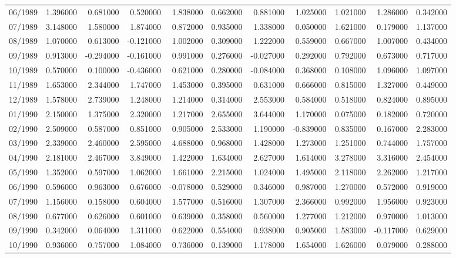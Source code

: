 \begin{tabular}{lrrrrrrrrrr}
06/1989 & 1.396000 & 0.681000 & 0.520000 & 1.838000 & 0.662000 & 0.881000 & 1.025000 & 1.021000 & 1.286000 & 0.342000 \\
07/1989 & 3.148000 & 1.580000 & 1.874000 & 0.872000 & 0.935000 & 1.338000 & 0.050000 & 1.621000 & 0.179000 & 1.137000 \\
08/1989 & 1.070000 & 0.613000 & -0.121000 & 1.002000 & 0.309000 & 1.222000 & 0.559000 & 0.667000 & 1.007000 & 0.434000 \\
09/1989 & 0.913000 & -0.294000 & -0.161000 & 0.991000 & 0.276000 & -0.027000 & 0.292000 & 0.792000 & 0.673000 & 0.717000 \\
10/1989 & 0.570000 & 0.100000 & -0.436000 & 0.621000 & 0.280000 & -0.084000 & 0.368000 & 0.108000 & 1.096000 & 1.097000 \\
11/1989 & 1.653000 & 2.344000 & 1.747000 & 1.453000 & 0.395000 & 0.631000 & 0.666000 & 0.815000 & 1.327000 & 0.449000 \\
12/1989 & 1.578000 & 2.739000 & 1.248000 & 1.214000 & 0.314000 & 2.553000 & 0.584000 & 0.518000 & 0.824000 & 0.895000 \\
01/1990 & 2.150000 & 1.375000 & 2.320000 & 1.217000 & 2.655000 & 3.644000 & 1.170000 & 0.075000 & 0.182000 & 0.720000 \\
02/1990 & 2.509000 & 0.587000 & 0.851000 & 0.905000 & 2.533000 & 1.190000 & -0.839000 & 0.835000 & 0.167000 & 2.283000 \\
03/1990 & 2.339000 & 2.460000 & 2.595000 & 4.688000 & 0.968000 & 1.428000 & 1.273000 & 1.251000 & 0.744000 & 1.757000 \\
04/1990 & 2.181000 & 2.467000 & 3.849000 & 1.422000 & 1.634000 & 2.627000 & 1.614000 & 3.278000 & 3.316000 & 2.454000 \\
05/1990 & 1.352000 & 0.597000 & 1.062000 & 1.661000 & 2.215000 & 1.024000 & 1.495000 & 2.118000 & 2.262000 & 1.217000 \\
06/1990 & 0.596000 & 0.963000 & 0.676000 & -0.078000 & 0.529000 & 0.346000 & 0.987000 & 1.270000 & 0.572000 & 0.919000 \\
07/1990 & 1.156000 & 0.158000 & 0.604000 & 1.577000 & 0.516000 & 1.307000 & 2.366000 & 0.992000 & 1.956000 & 0.923000 \\
08/1990 & 0.677000 & 0.626000 & 0.601000 & 0.639000 & 0.358000 & 0.560000 & 1.277000 & 1.212000 & 0.970000 & 1.013000 \\
09/1990 & 0.342000 & 0.064000 & 1.311000 & 0.622000 & 0.554000 & 0.938000 & 0.905000 & 1.583000 & -0.117000 & 0.629000 \\
10/1990 & 0.936000 & 0.757000 & 1.084000 & 0.736000 & 0.139000 & 1.178000 & 1.654000 & 1.626000 & 0.079000 & 0.288000 \\

\end{tabular}

